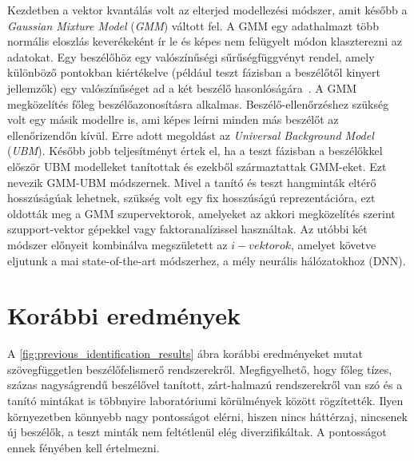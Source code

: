 Kezdetben a vektor kvantálás volt az elterjed modellezési módszer, amit később a \emph{Gaussian Mixture Model} (\emph{GMM}) váltott fel. A GMM egy adathalmazt több normális eloszlás keverékeként ír le és képes nem felügyelt módon klaszterezni az adatokat. Egy beszélőhöz egy valószínűségi sűrűségfüggvényt rendel, amely különböző pontokban kiértékelve (például teszt fázisban a beszélőtől kinyert jellemzők) egy valószínűséget ad a két beszélő hasonlóságára~\cite{taufiq_2015}.
\newline
\newline
A GMM megközelítés főleg beszélőazonosításra alkalmas. Beszélő-ellenőrzéshez szükség volt egy másik modellre is, ami képes leírni minden más beszélőt az ellenőrizendőn kívül. Erre adott megoldást az \emph{Universal Background Model} (\emph{UBM}). Később jobb teljesítményt értek el, ha a teszt fázisban a beszélőkkel először UBM modelleket tanítottak és ezekből származtattak GMM-eket. Ezt nevezik GMM-UBM módszernek.
\newline
\newline
Mivel a tanító és teszt hangminták eltérő hosszúságúak lehetnek, szükség volt egy fix hosszúságú reprezentációra, ezt oldották meg a GMM szupervektorok, amelyeket az akkori megközelítés szerint szupport-vektor gépekkel vagy faktoranalízissel használtak.
\newline
\newline
Az utóbbi két módszer előnyeit kombinálva megszületett az $i-vektorok$, amelyet követve eljutunk a mai state-of-the-art módszerhez, a mély neurális hálózatokhoz (DNN).

\section{Korábbi eredmények}

A \ref{fig:previous_identification_results} ábra korábbi eredményeket mutat szövegfüggetlen beszélőfelismerő rendszerekről. Megfigyelhető, hogy főleg tízes, százas nagyságrendű beszélővel tanított, zárt-halmazú rendszerekről van szó és a tanító mintákat is többnyire laboratóriumi körülmények között rögzítették. Ilyen környezetben könnyebb nagy pontosságot elérni, hiszen nincs háttérzaj, nincsenek új beszélők, a teszt minták nem feltétlenül elég diverzifikáltak. A pontosságot ennek fényében kell értelmezni.

